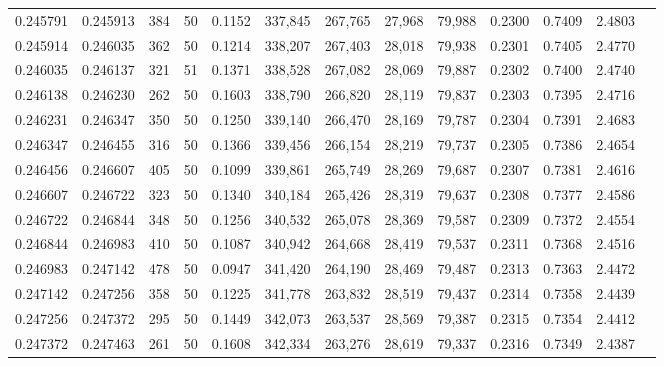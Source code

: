 \begin{tabular}{rrrrrrrrrrrrr}
0.245791 & 0.245913 &   384 &  50 &                                     0.1152 & 337,845 & 267,765 &  27,968 &  79,988 & 0.2300 & 0.7409 & 2.4803 \\
0.245914 & 0.246035 &   362 &  50 &                                     0.1214 & 338,207 & 267,403 &  28,018 &  79,938 & 0.2301 & 0.7405 & 2.4770 \\
0.246035 & 0.246137 &   321 &  51 &                                     0.1371 & 338,528 & 267,082 &  28,069 &  79,887 & 0.2302 & 0.7400 & 2.4740 \\
0.246138 & 0.246230 &   262 &  50 &                                     0.1603 & 338,790 & 266,820 &  28,119 &  79,837 & 0.2303 & 0.7395 & 2.4716 \\
0.246231 & 0.246347 &   350 &  50 &                                     0.1250 & 339,140 & 266,470 &  28,169 &  79,787 & 0.2304 & 0.7391 & 2.4683 \\
0.246347 & 0.246455 &   316 &  50 &                                     0.1366 & 339,456 & 266,154 &  28,219 &  79,737 & 0.2305 & 0.7386 & 2.4654 \\
0.246456 & 0.246607 &   405 &  50 &                                     0.1099 & 339,861 & 265,749 &  28,269 &  79,687 & 0.2307 & 0.7381 & 2.4616 \\
0.246607 & 0.246722 &   323 &  50 &                                     0.1340 & 340,184 & 265,426 &  28,319 &  79,637 & 0.2308 & 0.7377 & 2.4586 \\
0.246722 & 0.246844 &   348 &  50 &                                     0.1256 & 340,532 & 265,078 &  28,369 &  79,587 & 0.2309 & 0.7372 & 2.4554 \\
0.246844 & 0.246983 &   410 &  50 &                                     0.1087 & 340,942 & 264,668 &  28,419 &  79,537 & 0.2311 & 0.7368 & 2.4516 \\
0.246983 & 0.247142 &   478 &  50 &                                     0.0947 & 341,420 & 264,190 &  28,469 &  79,487 & 0.2313 & 0.7363 & 2.4472 \\
0.247142 & 0.247256 &   358 &  50 &                                     0.1225 & 341,778 & 263,832 &  28,519 &  79,437 & 0.2314 & 0.7358 & 2.4439 \\
0.247256 & 0.247372 &   295 &  50 &                                     0.1449 & 342,073 & 263,537 &  28,569 &  79,387 & 0.2315 & 0.7354 & 2.4412 \\
0.247372 & 0.247463 &   261 &  50 &                                     0.1608 & 342,334 & 263,276 &  28,619 &  79,337 & 0.2316 & 0.7349 & 2.4387 \\

\end{tabular}
